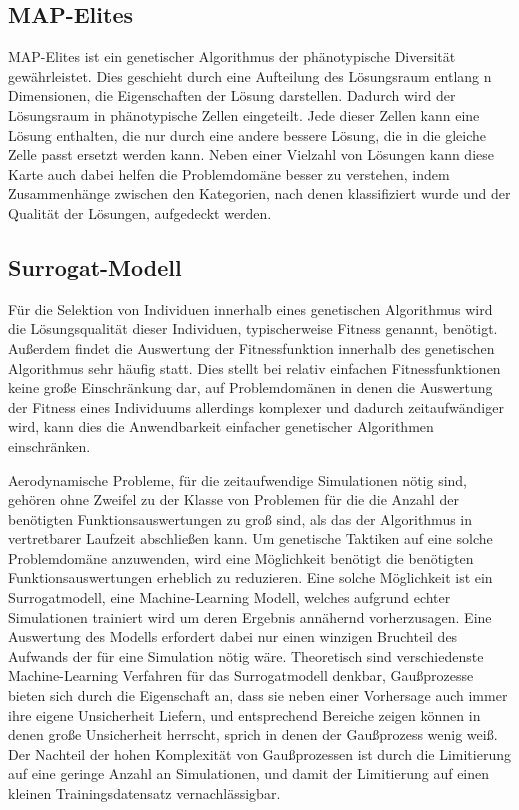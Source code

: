 \documentclass[12pt]{article}
\begin{document}
\subsection{MAP-Elites}
\label{sub:mapElites}
MAP-Elites ist ein genetischer Algorithmus der phänotypische Diversität gewährleistet.
Dies geschieht durch eine Aufteilung des Lösungsraum entlang n Dimensionen, die Eigenschaften der Lösung darstellen.
Dadurch wird der Lösungsraum in phänotypische Zellen eingeteilt.
Jede dieser Zellen kann eine Lösung enthalten, die nur durch eine andere bessere Lösung, die in die gleiche Zelle passt ersetzt werden kann.
Neben einer Vielzahl von Lösungen kann diese Karte auch dabei helfen die Problemdomäne besser zu verstehen, indem Zusammenhänge zwischen den Kategorien, nach denen klassifiziert wurde und der Qualität der Lösungen, aufgedeckt werden.

\subsection{Surrogat-Modell}
\label{sub:surrogate}
Für die Selektion von Individuen innerhalb eines genetischen Algorithmus wird die Lösungsqualität dieser Individuen, typischerweise Fitness genannt, benötigt.
Außerdem findet die Auswertung der Fitnessfunktion innerhalb des genetischen Algorithmus sehr häufig statt.
Dies stellt bei relativ einfachen Fitnessfunktionen keine große Einschränkung dar, auf Problemdomänen in denen die Auswertung der Fitness eines Individuums allerdings komplexer und dadurch zeitaufwändiger wird, kann dies die Anwendbarkeit einfacher genetischer Algorithmen einschränken.

Aerodynamische Probleme, für die zeitaufwendige Simulationen nötig sind, gehören ohne Zweifel zu der Klasse von Problemen für die die Anzahl der benötigten Funktionsauswertungen zu groß sind, als das der Algorithmus in vertretbarer Laufzeit abschließen kann.
Um genetische Taktiken auf eine solche Problemdomäne anzuwenden, wird eine Möglichkeit benötigt die benötigten Funktionsauswertungen erheblich zu reduzieren.
Eine solche Möglichkeit ist ein Surrogatmodell, eine Machine-Learning Modell, welches aufgrund echter Simulationen trainiert wird um deren Ergebnis annähernd vorherzusagen.
Eine Auswertung des Modells erfordert dabei nur einen winzigen Bruchteil des Aufwands der für eine Simulation nötig wäre.
Theoretisch sind verschiedenste Machine-Learning Verfahren für das Surrogatmodell denkbar, Gaußprozesse bieten sich durch die Eigenschaft an, dass sie neben einer Vorhersage auch immer ihre eigene Unsicherheit Liefern, und entsprechend Bereiche zeigen können in denen große Unsicherheit herrscht, sprich in denen der Gaußprozess wenig weiß.
Der Nachteil der hohen Komplexität von Gaußprozessen  ist durch die Limitierung auf eine geringe Anzahl an Simulationen, und damit der Limitierung auf einen kleinen Trainingsdatensatz vernachlässigbar.
\end{document}
